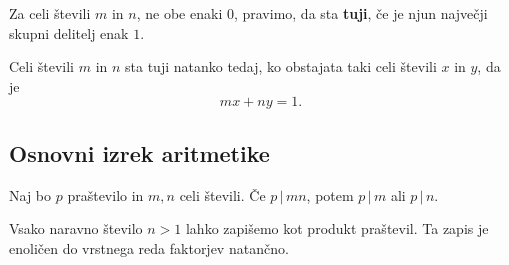 \begin{definicija}
    Za celi števili \(m\) in \(n\), ne obe enaki \(0\), pravimo, da sta \textbf{tuji}, če je njun največji skupni delitelj enak \(1\).    
\end{definicija}

\begin{posledica}
    Celi števili \(m\) in \(n\) sta tuji natanko tedaj, ko obstajata taki celi števili \(x\) in \(y\), da je 
    \[mx+ny = 1.\]
\end{posledica}

\subsection{Osnovni izrek aritmetike}
\begin{lema}
    Naj bo \(p\) praštevilo in \(m , n\) celi števili. Če \(p\, |\, mn\), potem \(p\, |\, m\) ali \(p\, | \, n\).
\end{lema}

\begin{izrek}
    Vsako naravno število \(n > 1\) lahko zapišemo kot produkt praštevil. Ta zapis je enoličen do vrstnega reda faktorjev natančno.
\end{izrek}
